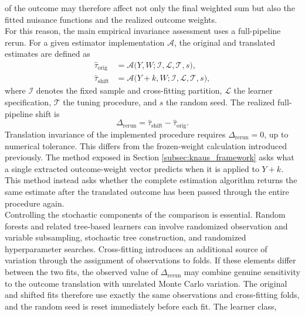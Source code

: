 \documentclass[12pt, a4paper, oneside]{article}
\theoremstyle{plain}
\theoremstyle{definition}
\begin{document}
of the outcome may therefore affect not only the final weighted sum but also
the fitted nuisance functions and the realized outcome weights.\\
For this reason, the main empirical invariance assessment uses a full-pipeline
rerun. For a given estimator implementation
\(\mathcal{A}\), the original and translated estimates are defined as
\begin{align}
    \widehat{\tau}_{\mathrm{orig}}
    &=
    \mathcal{A}
    \bigl(
        Y,W;
        \mathcal{I},
        \mathcal{L},
        \mathcal{T},
        s
    \bigr), \\
    \widehat{\tau}_{\mathrm{shift}}
    &=
    \mathcal{A}
    \bigl(
        Y+k,W;
        \mathcal{I},
        \mathcal{L},
        \mathcal{T},
        s
    \bigr),
\end{align}
where \(\mathcal{I}\) denotes the fixed sample and cross-fitting partition,
\(\mathcal{L}\) the learner specification,
\(\mathcal{T}\) the tuning procedure, and \(s\) the random seed. The realized
full-pipeline shift is
\begin{equation}
    \Delta_{\mathrm{rerun}}
    =
    \widehat{\tau}_{\mathrm{shift}}
    -
    \widehat{\tau}_{\mathrm{orig}}.
    \label{eq:method_a_rerun}
\end{equation}
Translation invariance of the implemented procedure requires
\(\Delta_{\mathrm{rerun}}=0\), up to numerical tolerance. This differs from
the frozen-weight calculation introduced previously. The method exposed in Section \ref{subsec:knaus_framework} asks what a
single extracted outcome-weight vector predicts when it is applied to
\(Y+k\). This method instead asks whether the complete estimation algorithm
returns the same estimate after the translated outcome has been passed through
the entire procedure again. \\
Controlling the stochastic components of the comparison is essential. Random
forests and related tree-based learners can involve randomized observation and
variable subsampling, stochastic tree construction, and randomized
hyperparameter searches. Cross-fitting introduces an additional source of
variation through the assignment of observations to folds. If these elements
differ between the two fits, the observed value of
\(\Delta_{\mathrm{rerun}}\) may combine genuine sensitivity to the outcome
translation with unrelated Monte Carlo variation. The original and shifted
fits therefore use exactly the same observations and cross-fitting folds, and
the random seed is reset immediately before each fit. The learner class,
\end{document}
